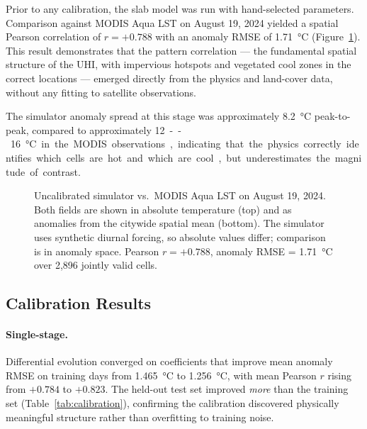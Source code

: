 \documentclass[12pt, letterpaper]{article}
\begin{document}
Prior to any calibration, the slab model was run with hand-selected
parameters. Comparison against MODIS Aqua LST on August 19, 2024 yielded
a spatial Pearson correlation of $r = +0.788$ with an anomaly RMSE of
\SI{1.71}{\degreeCelsius} (Figure~\ref{fig:uncalibrated}). This result
demonstrates that the pattern correlation — the fundamental spatial
structure of the UHI, with impervious hotspots and vegetated cool zones
in the correct locations — emerged directly from the physics and land-cover
data, without any fitting to satellite observations.

The simulator anomaly spread at this stage was approximately
\SI{8.2}{\degreeCelsius} peak-to-peak, compared to approximately
\SI{12}--\SI{16}{\degreeCelsius} in the MODIS observations, indicating
that the physics correctly identifies which cells are hot and which are
cool, but underestimates the magnitude of contrast.

\begin{figure}[ht]
  \centering
  \caption{Uncalibrated simulator vs.\ MODIS Aqua LST on August 19, 2024.
  Both fields are shown in absolute temperature (top) and as anomalies
  from the citywide spatial mean (bottom). The simulator uses synthetic
  diurnal forcing, so absolute values differ; comparison is in anomaly
  space. Pearson $r = +0.788$, anomaly RMSE = \SI{1.71}{\degreeCelsius}
  over 2,896 jointly valid cells.}
  \label{fig:uncalibrated}
\end{figure}

\subsection{Calibration Results}
\label{sec:cal_results}

\paragraph{Single-stage.}
Differential evolution converged on coefficients that improve mean anomaly
RMSE on training days from \SI{1.465}{\degreeCelsius} to
\SI{1.256}{\degreeCelsius}, with mean Pearson $r$ rising from $+0.784$ to
$+0.823$. The held-out test set improved \emph{more} than the training set
(Table~\ref{tab:calibration}), confirming the calibration discovered
physically meaningful structure rather than overfitting to training noise.
\end{document}
